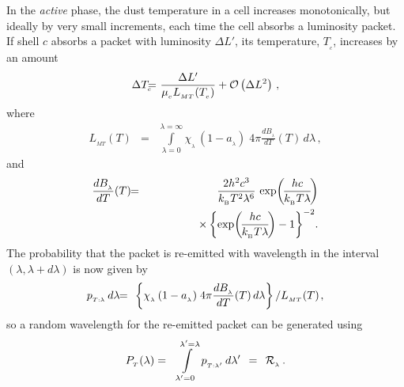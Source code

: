 \documentclass[usenatbib]{mn2e}
\numberwithin{equation}{section}
\begin{document}
In the {\it active} phase, the dust temperature in a cell increases monotonically, but ideally by very small increments, each time the cell absorbs a luminosity packet. If shell $c$ absorbs a packet with luminosity $\Delta L'$, its temperature, $T_{_c}$, increases by an amount
\begin{eqnarray}
\Delta T_{_c}\!\!&\!\!=\!\!&\!\!\frac{\Delta L'}{\mu_{_c}L_{_{MT}}(T_{_c})}+{\cal O}\left(\Delta L^2\right)\,,
\end{eqnarray}
where 
\begin{eqnarray}
L_{_{MT}}(T)&=&\int\limits_{\lambda=0}^{\lambda=\infty} \chi_{_\lambda}\,(1-a_{_\lambda})\;4\pi \frac{dB_{_\lambda}}{dT}(T)\,d\lambda\,,
\end{eqnarray}
and
\begin{eqnarray}\nonumber
\frac{dB_{_\lambda}}{dT}(T)\!&\!=\!&\!\frac{2h^2c^3}{k_{_{\rm B}}T^2\lambda^6}\,\exp\!\left(\!\frac{hc}{k_{_{\rm B}}T\lambda}\!\right)\\
&&\hspace{1.6cm}\times\left\{\exp\!\left(\!\frac{hc}{k_{_{\rm B}}T\lambda}\!\right)-1\right\}^{-2}\!.
\end{eqnarray}
The probability that the packet is re-emitted with wavelength in the interval $(\lambda,\lambda+d\lambda)$ is now given by
\begin{eqnarray}
p_{_{T:\lambda}}\,d\lambda\!&\!=\!&\!\left\{\chi_{_\lambda}\,(1-a_{_\lambda})\;4\pi \frac{dB_{_\lambda}}{dT}(T)\,d\lambda\right\}\left/L_{_{MT}}(T)\right.\!,
\end{eqnarray}
so a random wavelength for the re-emitted packet can be generated using
\begin{eqnarray}\nonumber
P_{_T}(\lambda)&=&\int\limits_{\lambda'=0}^{\lambda'=\lambda}\,p_{_{T:\lambda'}}\,d\lambda'\;\,=\;\,{\cal R}_{_\lambda}\,.
\end{eqnarray}
\end{document}
